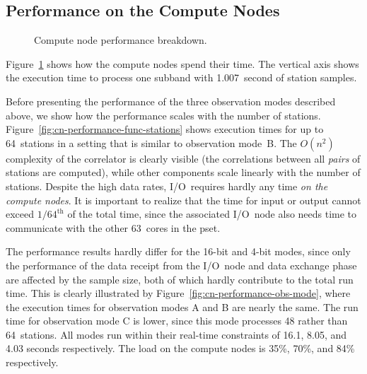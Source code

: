 \documentclass{sig-alternate}
\begin{document}
\subsection{Performance on the Compute Nodes}

\begin{figure}[ht]
\hfill
\caption{Compute node performance breakdown.}
\label{fig:cn-performance}
\end{figure}

Figure~\ref{fig:cn-performance} shows how the compute nodes spend their time.
The vertical axis shows the execution time to process one subband with
1.007~second of station samples.

Before presenting the performance of the three observation modes described
above, we show how the performance scales with the number of stations.
Figure~\ref{fig:cn-performance-func-stations} shows execution times for up to
64~stations in a setting that is similar to observation mode~\textsf{B}.
The $O(n^2)$ complexity of the correlator is clearly visible (the correlations
between all \emph{pairs\/} of stations are computed), while other
components scale linearly with the number of stations.
Despite the high data rates, I/O~requires hardly any time \emph{on the compute nodes}.
It is important to realize that the time for input or output cannot exceed
$1/64^\mathrm{th}$ of the total time, since the associated I/O~node also needs
time to communicate with the other 63~cores in the pset.


The performance results hardly differ for the 16-bit and 4-bit modes,
since only the performance of the data receipt from the I/O~node and data
exchange phase are affected by the sample size, 
both of which hardly contribute to the total run time.
This is clearly illustrated by Figure~\ref{fig:cn-performance-obs-mode},
where the execution times for observation modes \textsf{A} and \textsf{B}
are nearly the same.
The run time for observation mode \textsf{C} is lower, since this mode
processes 48 rather than 64~stations.
All modes run within their real-time constraints of 16.1, 8.05, and 4.03
seconds respectively.
The load on the compute nodes is 35\%, 70\%, and 84\% respectively.
\end{document}
